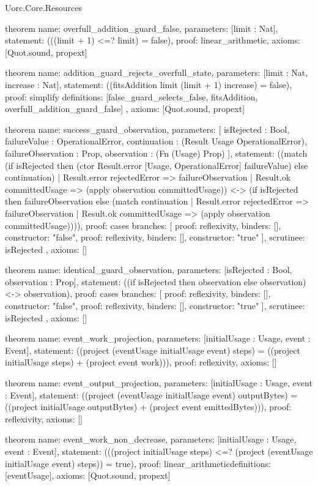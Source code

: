 \begin{lexlean}{Uorc.Core.Resources}
\begin{semanticmodule}
theorem{
  name: overfull_addition_guard_false,
  parameters: [limit : Nat],
  statement: (((limit + 1) <=? limit) = false),
  proof: linear_arithmetic{},
  axioms: [Quot.sound, propext]
}

theorem{
  name: addition_guard_rejects_overfull_state,
  parameters: [limit : Nat, increase : Nat],
  statement: ((fitsAddition limit (limit + 1) increase) = false),
  proof: simplify{
    definitions: [false_guard_selects_false, fitsAddition, overfull_addition_guard_false]
  },
  axioms: [Quot.sound, propext]
}

theorem{
  name: success_guard_observation,
  parameters: [
    isRejected : Bool,
    failureValue : OperationalError,
    continuation : (Result Usage OperationalError),
    failureObservation : Prop,
    observation : (Fn (Usage) Prop)
  ],
  statement: ((match (if isRejected then (ctor Result.error [Usage, OperationalError] failureValue) else continuation)
    | Result.error rejectedError => failureObservation
    | Result.ok committedUsage => (apply observation committedUsage)) <-> (if isRejected then failureObservation else (match continuation
    | Result.error rejectedError => failureObservation
    | Result.ok committedUsage => (apply observation committedUsage)))),
  proof: cases{
    branches: [
      {proof: reflexivity{}, binders: [], constructor: "false"},
      {proof: reflexivity{}, binders: [], constructor: "true"}
    ],
    scrutinee: isRejected
  },
  axioms: []
}

theorem{
  name: identical_guard_observation,
  parameters: [isRejected : Bool, observation : Prop],
  statement: ((if isRejected then observation else observation) <-> observation),
  proof: cases{
    branches: [
      {proof: reflexivity{}, binders: [], constructor: "false"},
      {proof: reflexivity{}, binders: [], constructor: "true"}
    ],
    scrutinee: isRejected
  },
  axioms: []
}

theorem{
  name: event_work_projection,
  parameters: [initialUsage : Usage, event : Event],
  statement: ((project (eventUsage initialUsage event) steps) = ((project initialUsage steps) + (project event work))),
  proof: reflexivity{},
  axioms: []
}

theorem{
  name: event_output_projection,
  parameters: [initialUsage : Usage, event : Event],
  statement: ((project (eventUsage initialUsage event) outputBytes) = ((project initialUsage outputBytes) + (project event emittedBytes))),
  proof: reflexivity{},
  axioms: []
}

theorem{
  name: event_work_non_decrease,
  parameters: [initialUsage : Usage, event : Event],
  statement: (((project initialUsage steps) <=? (project (eventUsage initialUsage event) steps)) = true),
  proof: linear_arithmetic{definitions: [eventUsage]},
  axioms: [Quot.sound, propext]
}


\end{semanticmodule}
\end{lexlean}
